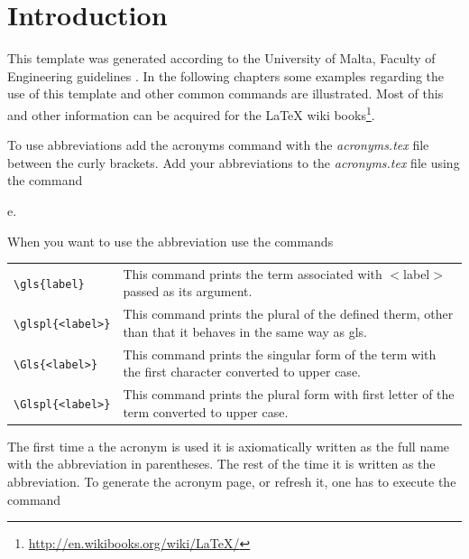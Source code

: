 

\frontmatter %

\chapter{Introduction}

This template was generated according to the University of Malta, Faculty of Engineering guidelines \cite{guidelines}. In the following chapters some examples regarding the use of this template and other common commands are illustrated. Most of this and other information can be acquired for the \LaTeX{} wiki books\footnote{\url{http://en.wikibooks.org/wiki/LaTeX/}}.

To use abbreviations add the acronyms command with the \textit{acronyms.tex} file between the curly brackets. Add your abbreviations to the \textit{acronyms.tex} file using the command
\begin{code}
e.\alpha
{}
\end{code}
When you want to use the abbreviation use the commands

\begin{table}[h!]
\center
\begin{tabular}{l p{11cm}}
\verb|\gls{label}| & This command prints the term associated with $<$label$>$ passed as its argument.\\
\verb|\glspl{<label>}| & This command prints the plural of the defined therm, other than that it behaves in the same way as gls.\\
\verb|\Gls{<label>}| & This command prints the singular form of the term with the first character converted to upper case.\\
\verb|\Glspl{<label>}| & This command prints the plural form with first letter of the term converted to upper case.\\
\end{tabular}
\end{table}

The first time a the acronym is used it is axiomatically written as the full name with the abbreviation in parentheses. The rest of the time it is written as the abbreviation. To generate the acronym page, or refresh it, one has to execute the command

